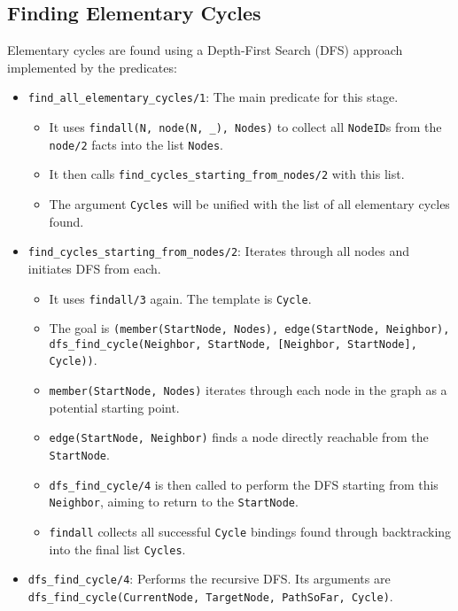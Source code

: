 \documentclass[12pt,a4paper]{article}
\begin{document}
\subsection{Finding Elementary Cycles}
Elementary cycles are found using a Depth-First Search (DFS) approach implemented by the predicates:
\begin{itemize}
    \item \texttt{find\_all\_elementary\_cycles/1}: The main predicate for this stage.
        \begin{itemize}
            \item It uses \texttt{findall(N, node(N, \_), Nodes)} to collect all \texttt{NodeID}s from the \texttt{node/2} facts into the list \texttt{Nodes}.
            \item It then calls \texttt{find\_cycles\_starting\_from\_nodes/2} with this list.
            \item The argument \texttt{Cycles} will be unified with the list of all elementary cycles found.
        \end{itemize}
    \item \texttt{find\_cycles\_starting\_from\_nodes/2}: Iterates through all nodes and initiates DFS from each.
        \begin{itemize}
            \item It uses \texttt{findall/3} again. The template is \texttt{Cycle}.
            \item The goal is \texttt{(member(StartNode, Nodes), edge(StartNode, Neighbor), dfs\_find\_cycle(Neighbor, StartNode, [Neighbor, StartNode], Cycle))}.
            \item \texttt{member(StartNode, Nodes)} iterates through each node in the graph as a potential starting point.
            \item \texttt{edge(StartNode, Neighbor)} finds a node directly reachable from the \texttt{StartNode}.
            \item \texttt{dfs\_find\_cycle/4} is then called to perform the DFS starting from this \texttt{Neighbor}, aiming to return to the \texttt{StartNode}.
            \item \texttt{findall} collects all successful \texttt{Cycle} bindings found through backtracking into the final list \texttt{Cycles}.
        \end{itemize}
    \item \texttt{dfs\_find\_cycle/4}: Performs the recursive DFS. Its arguments are \texttt{dfs\_find\_cycle(CurrentNode, TargetNode, PathSoFar, Cycle)}.

\end{itemize}
\end{document}
